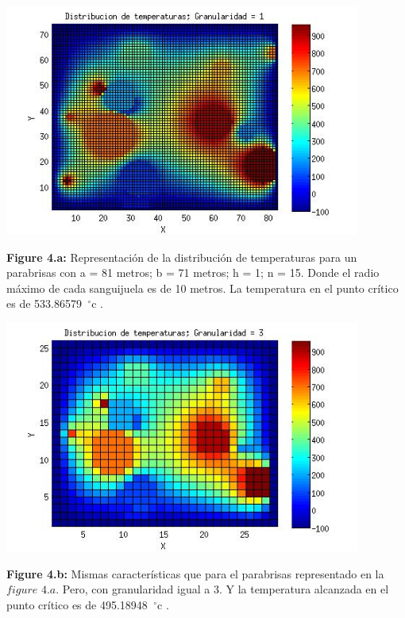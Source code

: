 \documentclass[a4paper]{article}
\begin{document}
\includegraphics[width=\textwidth,height=3.0in,keepaspectratio
]{82x71h1.jpg} \newline
\begin {flushleft}
\textbf{Figure 4.a:} Representación de la distribución de temperaturas para un parabrisas con a = 81 metros; b = 71 metros; h = 1; n = 15. Donde el radio máximo de cada sanguijuela es de 10 metros. La temperatura en el punto crítico es de 533.86579\hspace{-1.5mm}$\phantom{a}^{\circ}$c .
\end{flushleft}

\includegraphics[width=\textwidth,height=3.0in,keepaspectratio
]{82x71h3.jpg} \newline
\begin {flushleft}
\textbf{Figure 4.b:} Mismas características que para el parabrisas representado en la $figure$ $4.a$. Pero, con granularidad igual a 3. Y la temperatura alcanzada en el punto crítico es de 495.18948\hspace{-1.5mm}$\phantom{a}^{\circ}$c .
\end{flushleft}
\end{document}
